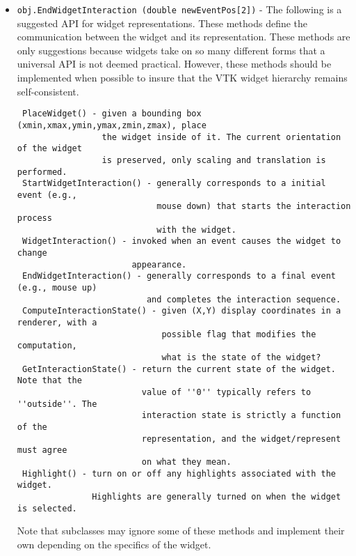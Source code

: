 \begin{itemize}
\item  \verb|obj.EndWidgetInteraction (double newEventPos[2])| -  The following is a suggested API for widget representations. These methods
 define the communication between the widget and its representation. These
 methods are only suggestions because widgets take on so many different
 forms that a universal API is not deemed practical. However, these methods
 should be implemented when possible to insure that the VTK widget hierarchy
 remains self-consistent.
 \begin{verbatim}
 PlaceWidget() - given a bounding box (xmin,xmax,ymin,ymax,zmin,zmax), place 
                 the widget inside of it. The current orientation of the widget 
                 is preserved, only scaling and translation is performed.
 StartWidgetInteraction() - generally corresponds to a initial event (e.g.,
                            mouse down) that starts the interaction process
                            with the widget.
 WidgetInteraction() - invoked when an event causes the widget to change 
                       appearance.
 EndWidgetInteraction() - generally corresponds to a final event (e.g., mouse up)
                          and completes the interaction sequence.
 ComputeInteractionState() - given (X,Y) display coordinates in a renderer, with a
                             possible flag that modifies the computation,
                             what is the state of the widget?
 GetInteractionState() - return the current state of the widget. Note that the
                         value of ''0'' typically refers to ''outside''. The 
                         interaction state is strictly a function of the
                         representation, and the widget/represent must agree
                         on what they mean.
 Highlight() - turn on or off any highlights associated with the widget.
               Highlights are generally turned on when the widget is selected.
 \end{verbatim}
 Note that subclasses may ignore some of these methods and implement their own
 depending on the specifics of the widget.


\end{itemize}
